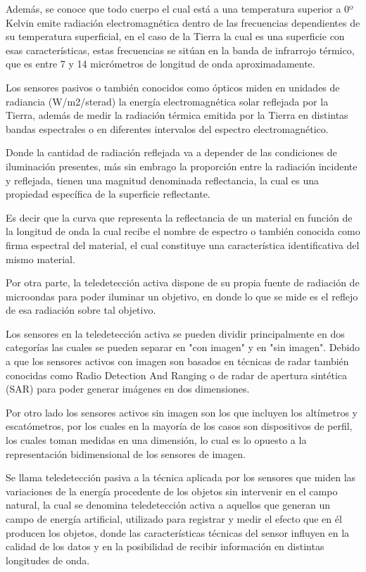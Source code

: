 Además, se conoce que todo cuerpo el cual está a una temperatura superior a 0º Kelvin emite radiación electromagnética dentro de las frecuencias dependientes de su temperatura superficial, en el caso de la Tierra la cual es una superficie con esas características, estas frecuencias se sitúan en la banda de infrarrojo térmico, que es entre 7 y 14 micrómetros de longitud de onda aproximadamente.

Los sensores pasivos o también conocidos como ópticos miden en unidades de radiancia (W/m2/sterad) la energía electromagnética solar reflejada por la Tierra, además de medir la radiación térmica emitida por la Tierra en distintas bandas espectrales o en diferentes intervalos del espectro electromagnético.

Donde la cantidad de radiación reflejada va a depender de las condiciones de iluminación presentes, más sin embrago la proporción entre la radiación incidente y reflejada, tienen una magnitud denominada reflectancia, la cual es una propiedad específica de la superficie reflectante.

Es decir que la curva que representa la reflectancia de un material en función de la longitud de onda la cual recibe el nombre de espectro o también conocida como firma espectral del material, el cual constituye una característica identificativa del mismo material.

Por otra parte, la teledetección activa dispone de su propia fuente de radiación de microondas para poder iluminar un objetivo, en donde lo que se mide es el reflejo de esa radiación sobre tal objetivo. \cite{AcevoHerrera2011Apr}

Los sensores en la teledetección activa se pueden dividir principalmente en dos categorías las cuales se pueden separar en "con imagen" y en "sin imagen". Debido a que los sensores activos con imagen son basados en técnicas de radar también conocidas como Radio Detection And Ranging o de radar de apertura sintética (SAR) para poder generar imágenes en dos dimensiones. 

Por otro lado los sensores activos sin imagen son los que incluyen los altímetros y escatómetros, por los cuales en la mayoría de los casos son dispositivos de perfil, los cuales toman medidas en una dimensión, lo cual es lo opuesto a la representación bidimensional de los sensores de imagen.

Se llama teledetección pasiva a la técnica aplicada por los sensores que miden las variaciones de la energía procedente de los objetos sin intervenir en el campo natural, la cual se denomina teledetección activa a aquellos que generan un campo de energía artificial, utilizado para registrar y medir el efecto que en él producen los objetos, donde las características técnicas del sensor influyen en la calidad de los datos y  en la posibilidad de recibir información en distintas longitudes de onda.

